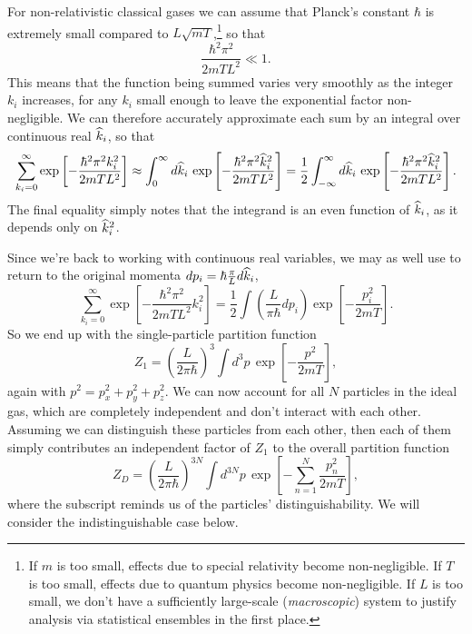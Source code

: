 For non-relativistic classical gases we can assume that Planck's constant $\hbar$ is extremely small compared to $L\sqrt{mT}$,\footnote{If $m$ is too small, effects due to special relativity become non-negligible.  If $T$ is too small, effects due to quantum physics become non-negligible.  If $L$ is too small, we don't have a sufficiently large-scale (\textit{macroscopic}) system to justify analysis via statistical ensembles in the first place.} so that %
\begin{equation*}
  \frac{\hbar^2 \pi^2}{2mTL^2} \ll 1.
\end{equation*}
This means that the function being summed varies very smoothly as the integer $k_i$ increases, for any $k_i$ small enough to leave the exponential factor non-negligible.
We can therefore accurately approximate each sum by an integral over continuous real $\widehat k_i$, so that
\begin{equation*}
  \sum_{k_i = 0}^{\infty} \exp\left[-\frac{\hbar^2 \pi^2 k_i^2}{2mTL^2}\right] \approx \int_0^{\infty} d\widehat k_i \, \exp\left[-\frac{\hbar^2 \pi^2 \widehat k_i^2}{2mTL^2}\right] = \frac{1}{2} \int_{-\infty}^{\infty} d\widehat k_i \, \exp\left[-\frac{\hbar^2 \pi^2 \widehat k_i^2}{2mTL^2}\right].
\end{equation*}
The final equality simply notes that the integrand is an even function of $\widehat k_i$, as it depends only on $\widehat k_i^2$.

Since we're back to working with continuous real variables, we may as well use  to return to the original momenta $dp_i = \hbar \frac{\pi}{L} d\widehat k_i$,
\begin{equation*}
  \sum_{k_i = 0}^{\infty} \exp\left[-\frac{\hbar^2 \pi^2}{2mTL^2} k_i^2\right] = \frac{1}{2} \int \left(\frac{L}{\pi\hbar} dp_i\right) \exp\left[-\frac{p_i^2}{2mT}\right].
\end{equation*}
So we end up with the single-particle partition function
\begin{equation*}
  Z_1 = \left(\frac{L}{2\pi\hbar}\right)^3 \int d^3p \, \exp\left[-\frac{p^2}{2mT}\right],
\end{equation*}
again with $p^2 = p_x^2 + p_y^2 + p_z^2$.
We can now account for all $N$ particles in the ideal gas, which are completely independent and don't interact with each other.
Assuming we can distinguish these particles from each other, then each of them simply contributes an independent factor of $Z_1$ to the overall partition function
\begin{equation}
  \label{eq:ideal_dist_int}
  Z_D = \left(\frac{L}{2\pi\hbar}\right)^{3N} \int d^{3N}p \, \exp\left[-\sum_{n = 1}^N \frac{p_n^2}{2mT}\right],
\end{equation}
where the subscript reminds us of the particles' distinguishability.
We will consider the indistinguishable case below.

